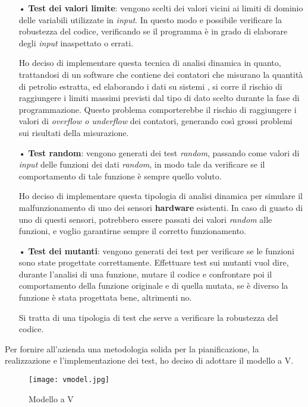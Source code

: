 \begin{itemize}
\item[•] \textbf{Test dei valori limite}: vengono scelti dei valori vicini ai limiti di dominio delle variabili utilizzate in \textit{input}. In questo modo e possibile verificare la robustezza del codice, verificando se il programma è in grado di elaborare degli \textit{input} inaspettato o errati.

Ho deciso di implementare questa tecnica di analisi dinamica in quanto, trattandosi di un software che contiene dei contatori che misurano la quantità di petrolio estratta, ed elaborando i dati su sistemi , si corre il rischio di raggiungere i limiti massimi previsti dal tipo di dato scelto durante la fase di programmazione. Questo problema comporterebbe il rischio di raggiungere i valori di \textit{overflow o underflow} dei contatori, generando così grossi problemi sui risultati della misurazione.

\item[•] \textbf{Test random}: vengono generati dei test \textit{random}, passando come valori di \textit{input} delle funzioni dei dati \textit{random}, in modo tale da verificare se il comportamento di tale funzione è sempre quello voluto.

Ho deciso di implementare questa tipologia di analisi dinamica per simulare il malfunzionamento di uno dei sensori \textbf{hardware} esistenti. In caso di guasto di uno di questi sensori, potrebbero essere passati dei valori \textit{random} alle funzioni, e voglio garantirne sempre il corretto funzionamento.

\item[•] \textbf{Test dei mutanti}: vengono generati dei test per verificare se le funzioni sono state progettate correttamente. Effettuare test sui mutanti vuol dire, durante l'analisi di una funzione, mutare il codice e confrontare poi il comportamento della funzione originale e di quella mutata, se è diverso la funzione è stata progettata bene, altrimenti no.

Si tratta di una tipologia di test che serve a verificare la robustezza del codice.
\end{itemize}

Per fornire all'azienda una metodologia solida per la pianificazione, la realizzazione e l'implementazione dei test, ho deciso di adottare il modello a V.

\begin{figure}[H]
  \centering
  \texttt{[image: vmodel.jpg]}
  \caption{Modello a V}
\end{figure}

